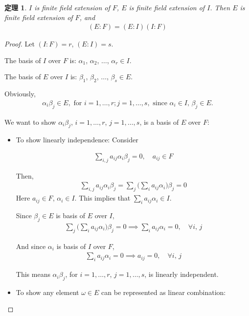 \documentclass[utf8]{ctexbook}
\newtheorem{theorem}{定理}[section]
\begin{document}
\begin{theorem}
\label{theorem_4_3_1_finite_extension_transitivity}
$I$ is finite field extension of $F$, $E$ is finite field extension of $I$. Then $E$ is finite field extension of $F$, and
\begin{align*}
(E:F) = (E: I) (I:F)
\end{align*}
\end{theorem}

\begin{proof}
Let $(I:F) = r$, $(E: I) = s$.

The basis of $I$ over $F$ is: $\alpha_1$, $\alpha_2$, $\ldots$, $\alpha_r \in I$.

The basis of $E$ over $I$ is: $\beta_1$, $\beta_2$, $\ldots$, $\beta_s \in E$.

Obviously,
\begin{align*}
\alpha_i \beta_j \in E, \mbox{ for } i = 1, \ldots, r; j = 1, \ldots, s, \mbox{ since } \alpha_i \in I, \, \beta_j \in E .
\end{align*} 

We want to show $\alpha_i \beta_j$, $i = 1, \ldots, r$, $j = 1, \ldots, s $, is a basis of $E$ over $F$:
\begin{itemize}
\item{To show linearly independence:
Consider

\begin{align*}
\sum_{i,j} a_{ij} \alpha_i \beta_j = 0, \quad a_{ij} \in F
\end{align*}

Then,
\begin{align*}
\sum_{i,j} a_{ij} \alpha_i \beta_j = \sum_j \bigg( \sum_i a_{ij} \alpha_i \bigg) \beta_j = 0
\end{align*}
Here $a_{ij} \in F$, $\alpha_i \in I$. This implies that $\sum_i a_{ij} \alpha_i \in I $.

Since $\beta_j \in E$ is basis of $E$ over $I$, 
\begin{align*}
\sum_j \bigg( \sum_i a_{ij} \alpha_i \bigg) \beta_j = 0 \implies \sum_i a_{ij} \alpha_i = 0, \quad \forall i,\, j
\end{align*}

And since $\alpha_i$ is basis of $I$ over $F$,
\begin{align*}
\sum_i a_{ij} \alpha_i = 0 \implies a_{ij} = 0, \quad \forall i,\, j
\end{align*}

This means $\alpha_i \beta_j$, for $i= 1, \ldots, r$, $j = 1, \ldots, s$, is linearly independent.
}
\item{To show any element $\omega \in E$ can be represented as linear combination:

}
\end{itemize}
\end{proof}
\end{document}

